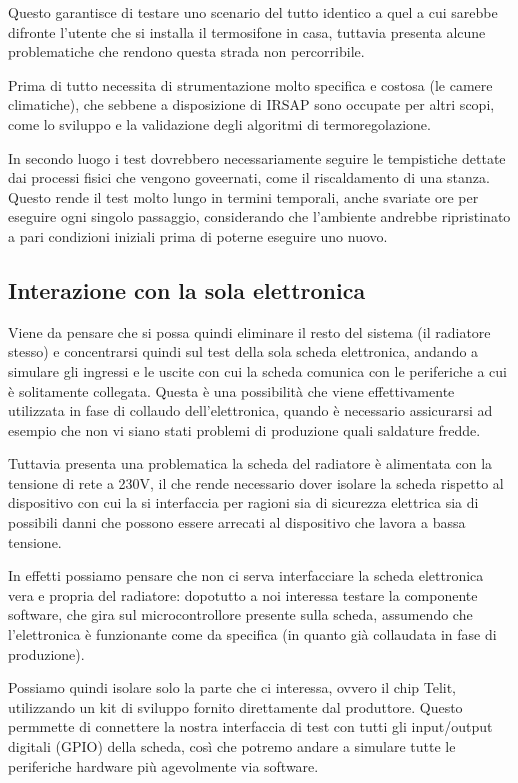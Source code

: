 \documentclass[12pt,a4paper,twoside,titlepage]{book}
\begin{document}
Questo garantisce di testare uno scenario del tutto identico a quel a cui sarebbe
difronte l'utente che si installa il termosifone in casa, tuttavia presenta alcune
problematiche che rendono questa strada non percorribile.

Prima di tutto necessita di strumentazione molto specifica e costosa (le camere climatiche),
che sebbene a disposizione di IRSAP sono occupate per altri scopi, come lo sviluppo e
la validazione degli algoritmi di termoregolazione.

In secondo luogo i test dovrebbero necessariamente seguire le tempistiche dettate dai processi
fisici che vengono goveernati, come il riscaldamento di una stanza.
Questo rende il test molto lungo in termini temporali, anche svariate ore per eseguire ogni singolo
passaggio, considerando che l'ambiente andrebbe ripristinato a pari condizioni iniziali prima
di poterne eseguire uno nuovo.

\subsection{Interazione con la sola elettronica}

Viene da pensare che si possa quindi eliminare il resto del sistema (il radiatore
stesso) e concentrarsi quindi sul test della sola scheda elettronica, andando a
simulare gli ingressi e le uscite con cui la scheda comunica con le periferiche
a cui è solitamente collegata. Questa è una possibilità che viene effettivamente
utilizzata in fase di collaudo dell'elettronica, quando è necessario assicurarsi ad
esempio che non vi siano stati problemi di produzione quali saldature fredde.

Tuttavia presenta una problematica la scheda del radiatore è alimentata con
la tensione di rete a 230V, il che rende necessario dover isolare la scheda rispetto
al dispositivo con cui la si interfaccia per ragioni sia di sicurezza elettrica sia
di possibili danni che possono essere arrecati al dispositivo che lavora a bassa tensione.

In effetti possiamo pensare che non ci serva interfacciare la scheda elettronica
vera e propria del radiatore: dopotutto a noi interessa testare la componente software,
che gira sul microcontrollore presente sulla scheda, assumendo che l'elettronica è
funzionante come da specifica (in quanto già collaudata in fase di produzione).

Possiamo quindi isolare solo la parte che ci interessa, ovvero il chip Telit, utilizzando
un kit di sviluppo fornito direttamente dal produttore. Questo permmette di connettere
la nostra interfaccia di test con tutti gli input/output digitali (GPIO) della scheda,
così che potremo andare a simulare tutte le periferiche hardware più agevolmente via software.
\end{document}
